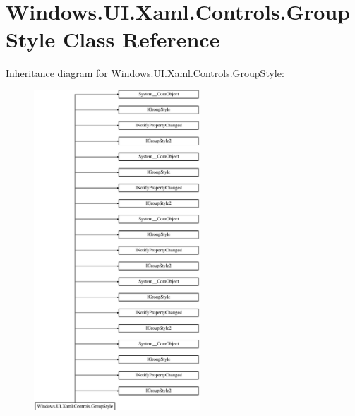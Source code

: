 \hypertarget{class_windows_1_1_u_i_1_1_xaml_1_1_controls_1_1_group_style}{}\section{Windows.\+U\+I.\+Xaml.\+Controls.\+Group\+Style Class Reference}
\label{class_windows_1_1_u_i_1_1_xaml_1_1_controls_1_1_group_style}
Inheritance diagram for Windows.\+U\+I.\+Xaml.\+Controls.\+Group\+Style\+:\begin{figure}[H]
\begin{center}
\leavevmode
\includegraphics[height=12.000000cm]{class_windows_1_1_u_i_1_1_xaml_1_1_controls_1_1_group_style}
\end{center}
\end{figure}
